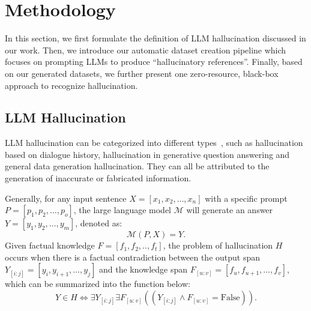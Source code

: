 \section{Methodology}
In this section, we first formulate the definition of LLM hallucination discussed in our work. Then, we introduce our automatic dataset creation pipeline which focuses on prompting LLMs to produce ``hallucinatory references''. Finally, based on our generated datasets, we further present one zero-resource, black-box approach to recognize hallucination. 
\subsection{LLM Hallucination}
LLM hallucination can be categorized into different types~\citep{galitsky2023truth}, such as hallucination based on dialogue history, hallucination in generative question answering and general data generation hallucination. They can all be attributed to the generation of inaccurate or fabricated information.


Generally, for any input sentence $X =[x_1, x_2, \ldots, x_n]$ with a specific prompt $P = [p_1, p_2, \ldots, p_o]$, the large language model $\mathcal{M}$ will generate an answer $Y = [y_1, y_2, \ldots, y_m]$, denoted as:
\begin{equation}
\mathcal{M}(P, X) = Y.
\end{equation}
Given factual knowledge $F=[f_1,f_2,..,f_t]$, the problem of hallucination $H$ occurs when there is a factual contradiction between the output span $Y_{[i:j]}=[y_i,y_{i+1},\dots,y_j]$ and the knowledge span $F_{[u:v]}=[f_u,f_{u+1},\dots,f_{v}]$, which can be summarized into the function below:
\begin{equation}\label{halluFunc}
Y \in H\Leftrightarrow\exists Y_{[i:j]} \exists F_{[u:v]} (( Y_{[i:j]}\land F_{[u:v]} = \text{False})).
\end{equation}



